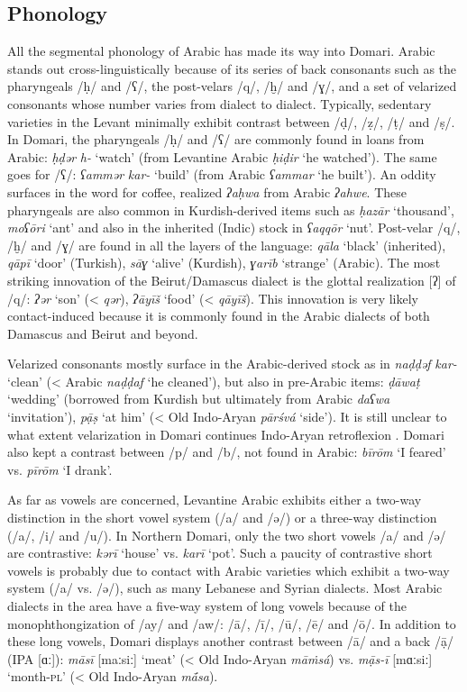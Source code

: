 \documentclass[output=paper]{langsci/langscibook}
\begin{document}
 
 \subsection{Phonology}


All the segmental phonology of Arabic has made its way into Domari. Arabic stands out cross-linguistically because of its series of back consonants such as the pharyngeals /ḥ/ and /ʕ/, the post-velars /q/, /ḫ/ and /ɣ/, and a set of velarized consonants whose number varies from dialect to dialect. Typically, sedentary varieties in the Levant minimally exhibit contrast between /ḍ/, /ẓ/, /ṭ/ and /ṣ/. In Domari, the pharyngeals /ḥ/ and /ʕ/ are commonly found in loans from Arabic: \textit{ḥḍər} \textit{h-} ‘watch’ (from Levantine Arabic \textit{ḥiḍir} ‘he watched’). The same goes for /ʕ/: \textit{ʕammər} \textit{kar-} `build' (from Arabic \textit{ʕammar} `he built'). An oddity surfaces in the word for coffee, realized \textit{ʔaḥwa} from Arabic \textit{ʔahwe}. These pharyngeals are also common in Kurdish-derived items such as \textit{ḥazār} ‘thousand’, \textit{moʕōri} ‘ant’ and also in the inherited (Indic) stock in \textit{ʕaqqōr} ‘nut’. Post-velar /q/, /ḫ/ and /ɣ/ are found in all the layers of the language: \textit{qāla} ‘black’ (inherited), \textit{qāpī} ‘door’ (Turkish), \textit{sāɣ} ‘alive’ (Kurdish), \textit{ɣarīb} ‘strange’ (Arabic). The most striking innovation of the Beirut/Damascus dialect is the glottal realization [ʔ] of /q/: \textit{ʔər} ‘son’ (< \textit{qər}), \textit{ʔāyīš} ‘food’ (< \textit{qāyīš}). This innovation is very likely contact-induced because it is commonly found in the Arabic dialects of both Damascus and Beirut and beyond. 

Velarized consonants mostly surface in the Arabic-derived stock as in \textit{naḍḍəf} \textit{kar-} ‘clean’ (< Arabic \textit{naḍḍaf} ‘he cleaned’), but also in pre-Arabic items: \textit{ḍāwaṭ} ‘wedding’ (borrowed from Kurdish but ultimately from Arabic \textit{daʕwa} ‘invitation’), \textit{pạ̄ṣ} ‘at him’ (< Old Indo-Aryan \textit{pārśvá} ‘side’). It is still unclear to what extent velarization in Domari continues Indo-Aryan retroflexion \citep[64]{Matras2012}. Domari also kept a contrast between /p/ and /b/, not found in Arabic: \textit{bīrōm} ‘I feared’ vs. \textit{pīrōm} ‘I drank’. 

As far as vowels are concerned, Levantine Arabic exhibits either a two-way distinction in the short vowel system (/a/ and /ə/) or a three-way distinction (/a/, /i/ and /u/). In Northern Domari, only the two short vowels /a/ and /ə/ are contrastive: \textit{kərī} ‘house’ vs. \textit{karī} ‘pot’. Such a paucity of contrastive short vowels is probably due to contact with Arabic varieties which exhibit a two-way system (/a/ vs. /ə/), such as many Lebanese and Syrian dialects. Most Arabic dialects in the area have a five-way system of long vowels because of the monophthongization of /ay/ and /aw/: /ā/, /ī/, /ū/, /ē/ and /ō/. In addition to these long vowels, Domari displays another contrast between /ā/ and a back /ạ̄/ (IPA [ɑː]): \textit{māsī} [maːsiː] ‘meat’ (< Old Indo-Aryan \textit{māṁsá})  vs. \textit{mạ̄s-ī} [mɑːsiː] ‘month-\textsc{pl}’ (< Old Indo-Aryan \textit{mā́sa}).
\end{document}
